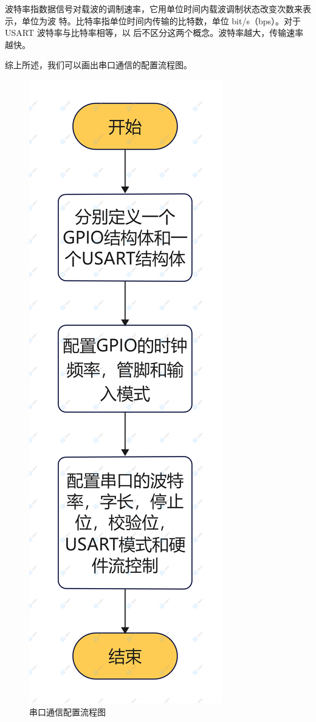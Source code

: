 \documentclass[UTF8,a4paper,11pt]{article}
\begin{document}
波特率指数据信号对载波的调制速率，它用单位时间内载波调制状态改变次数来表示，单位为波
特。比特率指单位时间内传输的比特数，单位 bit/s（bps）。对于 USART 波特率与比特率相等，以
后不区分这两个概念。波特率越大，传输速率越快。

综上所述，我们可以画出串口通信的配置流程图。

\begin{figure}[htbp]
    \centering
    \includegraphics[scale=0.14]{p16.png}
    \caption{串口通信配置流程图}
\end{figure} 
\end{document}
